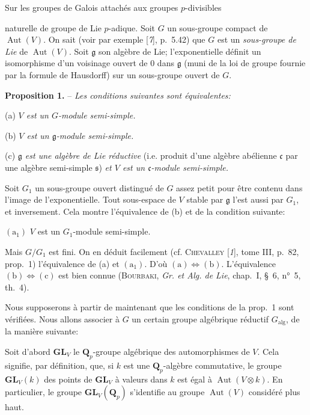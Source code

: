 \begin{center}\small Sur les groupes de Galois attachés aux groupes $p$-divisibles\end{center}
naturelle de groupe de Lie $p$-adique. Soit $G$ un sous-groupe compact de $\operatorname{Aut}(V)$. On sait (voir par exemple [\textit{7}], p.~5.42) que $G$ est un \textit{sous-groupe de Lie} de $\operatorname{Aut}(V)$. Soit $\mathfrak{g}$ son algèbre de Lie; l’exponentielle définit un isomorphisme d’un voisinage ouvert de $0$ dans $\mathfrak{g}$ (muni de la loi de groupe fournie par la formule de Hausdorff) sur un sous-groupe ouvert de $G$.

\textbf{Proposition 1.} -- \textit{Les conditions suivantes sont équivalentes:}

(a) \textit{$V$ est un $G$-module semi-simple.}

(b) \textit{$V$ est un $\mathfrak{g}$-module semi-simple.}

(c) \textit{$\mathfrak{g}$ est une algèbre de Lie réductive} (i.e. produit d’une algèbre abélienne $\mathfrak{c}$ par une algèbre semi-simple $\mathfrak{s}$) \textit{et $V$ est un $\mathfrak{c}$-module semi-simple.}

Soit $G_1$ un sous-groupe ouvert distingué de $G$ assez petit pour être contenu dans l’image de l’exponentielle. Tout sous-espace de $V$ stable par $\mathfrak{g}$ l’est aussi par $G_1$, et inversement. Cela montre l’équivalence de (b) et de la condition suivante:

$(\mathrm{a}_1)$ $V$ est un $G_1$-module semi-simple.

Mais $G/G_1$ est fini. On en déduit facilement (cf. \textsc{Chevalley} [\textit{1}], tome III, p.~82, prop.~1) l’équivalence de (a) et $(\mathrm{a}_1)$. D’où $\mathrm{(a)}\Leftrightarrow\mathrm{(b)}$. L’équivalence $\mathrm{(b)}\Leftrightarrow\mathrm{(c)}$ est bien connue (\textsc{Bourbaki}, \textit{Gr. et Alg. de Lie}, chap.~I, \S~6, n°~5, th.~4).

Nous supposerons à partir de maintenant que les conditions de la prop.~1 sont vérifiées. Nous allons associer à $G$ un certain groupe algébrique réductif $G_{\mathrm{alg}}$, de la manière suivante:

Soit d’abord $\mathbf{GL}_V$ le $\mathbf{Q}_p$-groupe algébrique des automorphismes de $V$. Cela signifie, par définition, que, si $k$ est une $\mathbf{Q}_p$-algèbre commutative, le groupe $\mathbf{GL}_V(k)$ des points de $\mathbf{GL}_V$ à valeurs dans $k$ est égal à $\operatorname{Aut}(V\otimes k)$. En particulier, le groupe $\mathbf{GL}_V(\mathbf{Q}_p)$ s’identifie au groupe $\operatorname{Aut}(V)$ considéré plus haut.

